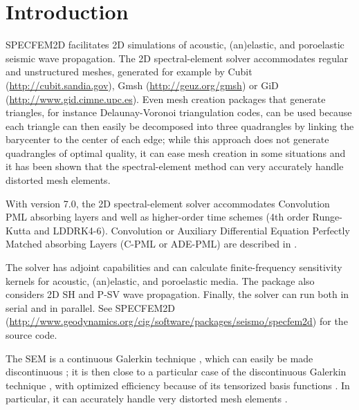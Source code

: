 \documentclass[oneside,english,onecolumn,letterpaper]{book}
\newcommand{\urlwithparentheses}[1]{(\url{#1})}
\begin{document}
\newpage

\tableofcontents


\chapter{Introduction}


SPECFEM2D facilitates 2D simulations of
acoustic, (an)elastic, and poroelastic seismic wave propagation.
The 2D spectral-element solver accommodates
regular and unstructured meshes, generated for example by Cubit
\urlwithparentheses{http://cubit.sandia.gov},
Gmsh \urlwithparentheses{http://geuz.org/gmsh}
or GiD \urlwithparentheses{http://www.gid.cimne.upc.es}.
Even mesh creation packages that generate triangles, for instance Delaunay-Voronoi triangulation codes, can be used because each triangle can then easily be decomposed into three quadrangles by linking the barycenter to the center of each edge; while this approach does not generate quadrangles of optimal quality, it can ease mesh creation in some situations and it has been shown that the spectral-element method can very accurately handle distorted mesh elements.

With version 7.0, the 2D spectral-element solver accommodates Convolution PML absorbing layers and well as higher-order time schemes
(4th order Runge-Kutta and LDDRK4-6).
Convolution or Auxiliary Differential Equation Perfectly Matched absorbing Layers (C-PML or ADE-PML)
are described in \cite{MaKoEz08,MaKoGe08,MaKo09,MaKoGeBr10,KoMa07}.

The solver has adjoint capabilities and can
calculate finite-frequency sensitivity kernels \citep{TrKoLi08,PeKoLuMaLeCaLeMaLiBlNiBaTr11} for acoustic,
(an)elastic, and poroelastic media. The package also considers 2D SH
and P-SV wave propagation. Finally, the solver can run
both in serial and in parallel. See SPECFEM2D
\urlwithparentheses{http://www.geodynamics.org/cig/software/packages/seismo/specfem2d}
for the source code.

The SEM is a continuous Galerkin technique \citep{TrKoLi08,PeKoLuMaLeCaLeMaLiBlNiBaTr11}, which can easily be made discontinuous \citep{BeMaPa94,Ch00,KoWoHu02,ChCaVi03,LaWaBe05,Kop06,WiStBuGh10,AcKo11}; it is then close to a particular case of the discontinuous Galerkin technique \citep{ReHi73,LeRa74,Arn82,JoPi86,BoMaHe91,FaRi99,HuHuRa99,CoKaSh00,GiHeWa02,RiWh03,MoRi05,GrScSc06,AiMoMu06,BeLaPi06,DuKa06,DeSeWh08,PuAmKa09,WiStBuGh10,DeSe10,EtChViGl10}, with optimized efficiency because of its tensorized basis functions \citep{WiStBuGh10,AcKo11}.
In particular, it can accurately handle very distorted mesh elements \citep{OlSe11}.
\end{document}
